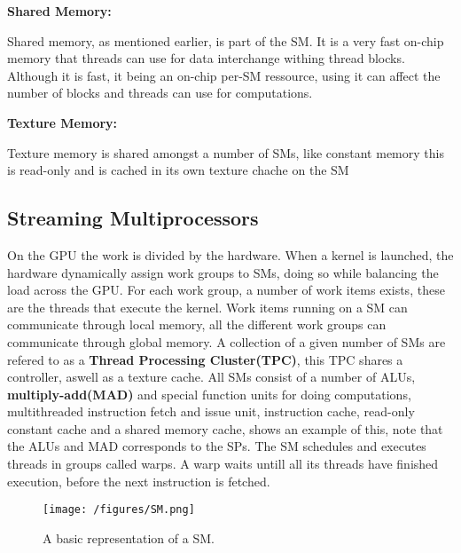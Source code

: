 \textbf{Shared Memory:}

Shared memory, as mentioned earlier, is part of the SM.
It is a very fast on-chip memory that threads can use for data interchange withing thread blocks.
Although it is fast, it being an on-chip per-SM ressource, using it can affect the number of blocks and threads can use for computations.

\textbf{Texture Memory:}

Texture memory is shared amongst a number of SMs, like constant memory this is read-only and is cached in its own texture chache on the SM

\subsection{Streaming Multiprocessors}
On the GPU the work is divided by the hardware.
When a kernel is launched, the hardware dynamically assign work groups to SMs, doing so while balancing the load across the GPU.
For each work group, a number of work items exists, these are the threads that execute the kernel.
Work items running on a SM can communicate through local memory, all the different work groups can communicate through global memory. %
A collection of a given number of SMs are refered to as a \textbf{Thread Processing Cluster(TPC)}, this TPC shares a controller, aswell as a texture cache.
All SMs consist of a number of ALUs, \textbf{multiply-add(MAD)} and special function units for doing computations, multithreaded instruction fetch and issue unit, instruction cache, read-only constant cache and a shared memory cache,  shows an example of this, note that the ALUs and MAD corresponds to the SPs.
The SM schedules and executes threads in groups called warps.
A warp waits untill all its threads have finished execution, before the next instruction is fetched. 
\begin{figure}[h!]
\centering
 \texttt{[image: /figures/SM.png]} %
\caption{A basic representation of a SM.}\label{image:SM} 
\end{figure}
